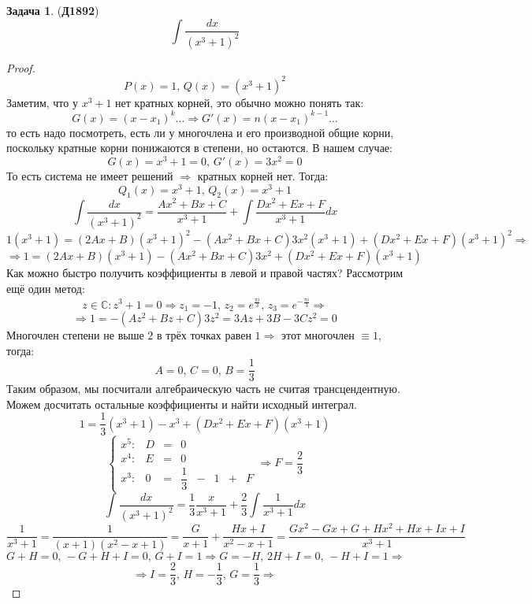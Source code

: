 \documentclass[12pt]{article}
\newcommand{\MC}{\mathbb{C}}
\theoremstyle{definition}
\newtheorem{problem}{Задача}
\DeclareMathOperator{\dint}{\displaystyle\int}
\begin{document}
\begin{problem}(\textbf{Д1892})
	$$
		\dint \dfrac{dx}{(x^3+1)^2}
	$$
\end{problem}

\begin{proof}
	$$
		P(x) = 1, \, Q(x) = (x^3 + 1)^2
	$$
	Заметим, что у $x^3 + 1$ нет кратных корней, это обычно можно понять так:
	$$
		G(x) = (x- x_1)^k\dotsc \Rightarrow G'(x) = n(x - x_1)^{k-1}\dotsc
	$$
	то есть надо посмотреть, есть ли у многочлена и его производной общие корни, поскольку кратные корни понижаются в степени, но остаются. В нашем случае:
	$$
		G(x) = x^3 + 1 = 0, \, G'(x) = 3x^2 = 0
	$$
	То есть система не имеет решений $\Rightarrow$ кратных корней нет. Тогда:
	$$
		Q_1(x) = x^3 + 1, \, Q_2(x) = x^3 + 1
	$$
	$$
		\dint \dfrac{dx}{(x^3 + 1)^2 } = \dfrac{Ax^2 + Bx + C}{x^3 +1} + \dint\dfrac{Dx^2 + Ex + F}{x^3 + 1}dx
	$$
	$$
		1(x^3 + 1) = (2Ax + B)(x^3 + 1)^2 - (Ax^2 + Bx + C)3x^2(x^3 + 1) + (Dx^2 + Ex + F)(x^3 +1)^2 \Rightarrow
	$$
	$$
		\Rightarrow 1 = (2Ax + B) (x^3+1) - (Ax^2 + Bx +C)3x^2 +(Dx^2 + Ex +F)(x^3 +1)
	$$
	Как можно быстро получить коэффициенты в левой и правой частях? Рассмотрим ещё один метод:
	$$
		z \in \MC \colon z^3 + 1 = 0 \Rightarrow z_1 = -1, \, z_2 = e^{\frac{\pi i}{3}}, \, z_3 = e^{-\frac{\pi i}{3}} \Rightarrow
	$$
	$$
		\Rightarrow 1 = -(Az^2 + Bz + C)3z^2 = 3Az + 3B - 3Cz^2 = 0
	$$
	Многочлен степени не выше $2$ в трёх точках равен $1 \Rightarrow$ этот многочлен $\equiv 1$, тогда:
	$$
		A = 0, \, C = 0, \, B = \dfrac{1}{3} 
	$$
	Таким образом, мы посчитали алгебраическую часть не считая трансцендентную. Можем досчитать остальные коэффициенты и найти исходный интеграл.
	$$
		1 = \dfrac{1}{3}(x^3 + 1) - x^3 + (Dx^2 + Ex + F)(x^3 + 1)
	$$
	$$
		\left\{
			\begin{matrix}
				x^5 \colon & D &=& 0 &&&& \\
				x^4 \colon & E &=& 0 &&&& \\
				x^3 \colon & 0 &=& \dfrac{1}{3} &-& 1 &+& F
			\end{matrix}
		\right. \Rightarrow F = \dfrac{2}{3} 
	$$
	$$
		\dint \dfrac{dx}{(x^3 + 1)^2 } = \dfrac{1}{3}\dfrac{ x }{x^3 +1} +\dfrac{2}{3} \dint\dfrac{1}{x^3 + 1}dx
	$$
	$$
		\dfrac{1}{x^3 + 1} = \dfrac{1}{(x + 1)(x^2 - x + 1)} = \dfrac{G}{x + 1} + \dfrac{Hx + I}{x^2 - x + 1} = \dfrac{Gx^2 -Gx + G + Hx^2 + Hx + Ix + I}{x^3 + 1}
	$$
	$$
		G + H = 0, \, -G + H + I = 0, \, G + I = 1 \Rightarrow G = -H,\, 2H + I = 0, \, -H + I = 1 \Rightarrow 
	$$
	$$
		\Rightarrow I = \dfrac{2}{3}, \, H = -\dfrac{1}{3}, \, G = \dfrac{1}{3} \Rightarrow
$$
\end{proof}
\end{document}
